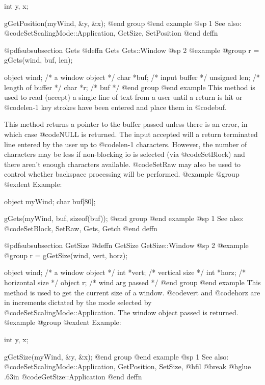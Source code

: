 int     y, x;

gGetPosition(myWind, &y, &x);
@end group
@end example
@sp 1
See also:  @code{SetScalingMode::Application, GetSize, SetPosition}
@end deffn







@pdfsubsubsection {Gets}
@deffn {Gets} Gets::Window
@sp 2
@example
@group
r = gGets(wind, buf, len);

object   wind;  /*  a window object       */
char    *buf;   /*  input buffer          */
unsigned len;   /*  length of buffer      */
char    *r;     /*  buf                   */
@end group
@end example
This method is used to read (accept) a single line of text from a user
until a return is hit or @code{len}-1 key strokes have been entered
and place them in @code{buf}.

This method returns a pointer to the buffer passed unless there is an
error, in which case @code{NULL} is returned.
The input accepted will a return terminated line entered by the user
up to @code{len}-1 characters.  However, the number of characters
may be less if non-blocking
io is selected (via @code{SetBlock}) and there aren't enough characters
available.  @code{SetRaw} may also be used to control whether backspace
processing will be performed.
@example
@group
@exdent Example:

object  myWind;
char    buf[80];

gGets(myWind, buf, sizeof(buf));
@end group
@end example
@sp 1
See also:  @code{SetBlock, SetRaw, Gets, Getch}
@end deffn












@pdfsubsubsection {GetSize}
@deffn {GetSize} GetSize::Window
@sp 2
@example
@group
r = gGetSize(wind, vert, horz);

object  wind;   /*  a window object     */
int    *vert;   /*  vertical size       */
int    *horz;   /*  horizontal size     */
object  r;      /*  wind arg passed     */
@end group
@end example
This method is used to get the current size of a window.
@code{vert} and @code{horz} are in increments dictated by the
mode selected by @code{SetScalingMode::Application}.  The window
object passed is returned.
@example
@group
@exdent Example:

int     y, x;

gGetSize(myWind, &y, &x);
@end group
@end example
@sp 1
See also:  @code{SetScalingMode::Application, GetPosition, SetSize,}
@hfil @break @hglue .63in @code{GetSize::Application}
@end deffn










